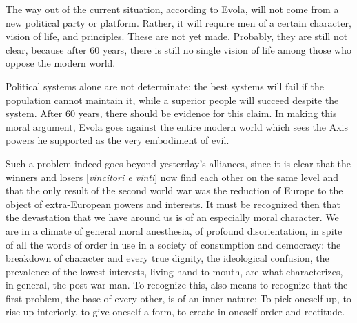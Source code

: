 \begin{quotex}
The way out of the current situation, according to Evola, will not come from a new political party or platform. Rather, it will require men of a certain character, vision of life, and principles. These are not yet made. Probably, they are still not clear, because after 60 years, there is still no single vision of life among those who oppose the modern world.

Political systems alone are not determinate: the best systems will fail if the population cannot maintain it, while a superior people will succeed despite the system. After 60 years, there should be evidence for this claim. In making this moral argument, Evola goes against the entire modern world which sees the Axis powers he supported as the very embodiment of evil. 

\end{quotex}
Such a problem indeed goes beyond yesterday's alliances, since it is clear that the winners and losers [\emph{vincitori e vinti}] now find each other on the same level and that the only result of the second world war was the reduction of Europe to the object of extra-European powers and interests. It must be recognized then that the devastation that we have around us is of an especially moral character. We are in a climate of general moral anesthesia, of profound disorientation, in spite of all the words of order in use in a society of consumption and democracy: the breakdown of character and every true dignity, the ideological confusion, the prevalence of the lowest interests, living hand to mouth, are what characterizes, in general, the post-war man. To recognize this, also means to recognize that the first problem, the base of every other, is of an inner nature: To pick oneself up, to rise up interiorly, to give oneself a form, to create in oneself order and rectitude.

